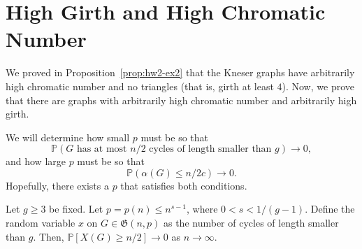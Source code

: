 \section{High Girth and High Chromatic Number}
\label{section:high-girth-high-chromatic-number}

We proved in Proposition~\ref{prop:hw2-ex2} that the Kneser graphs have arbitrarily high chromatic number and no triangles (that is, girth at least \(4\)).
Now, we prove that there are graphs with arbitrarily high chromatic number and arbitrarily high girth.

We will determine how small \(p\) must be so that 
\begin{equation}
    \mathbb{P}(\text{\(G\) has at most \(n/2\) cycles of length smaller than \(g\)}) \to 0,
\end{equation}
and how large \(p\) must be so that
\begin{equation}
    \mathbb{P}(\alpha(G) \leq n/2c) \to 0.
\end{equation}
Hopefully, there exists a \(p\) that satisfies both conditions.

\begin{lemma} \label{lem:bounding-short-cycles}
    Let \(g \geq 3\) be fixed.
    Let \(p = p(n) \leq n^{s-1}\), where \(0 < s < 1/(g-1)\).
    Define the random variable \(x\) on \(G \in \mathfrak{G}(n, p)\) as the number of cycles of length smaller than \(g\).
    Then, \(\mathbb{P}[X(G) \geq n/2] \to 0\) as \(n \to \infty\).
\end{lemma}

